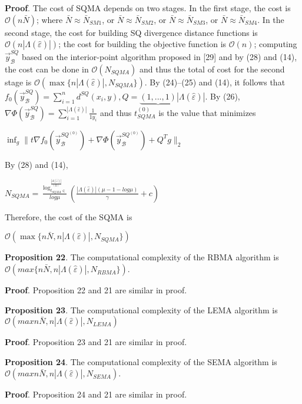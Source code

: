 \documentclass[]{iosart2c}
\begin{document}
\textbf{Proof}. The cost of SQMA depends on two stages. In
the first stage, the cost is $\mathcal{O}(n\bar N)$; where $\bar N \approx \bar N_{SM1}$, or $\bar N \approx \bar N_{SM2}$, or $\bar N \approx \bar N_{SM3}$, or $\bar N \approx \bar N_{SM4}$. In the
second stage, the cost for building SQ divergence distance
functions is $\mathcal{O}(n |\Lambda(\hat{\varepsilon})|)$; the cost for building
the objective function is $\mathcal{O}(n)$; computing $\vec{y}^{SQ}_\mathcal{B}$ based
on the interior-point algorithm proposed in [29] and
by (28) and (14), the cost can be done in $\mathcal{O}(N_{SQMA})$
and thus the total of cost for the second stage is
$\mathcal{O}(\max\{n |\Lambda(\hat{\varepsilon})|,N_{SQMA}\})$. By (24)–(25) and (14),
it follows that $f_0 \left( \vec{y}^{SQ}_\mathcal{B} \right) = \sum^n_{i=1} d^{SQ}(x_i, y), Q = \underbrace{(1, ... , 1)}{|\Lambda(\hat{\varepsilon})|}$. By (26), $\nabla \Phi \left( \vec{y}^{SQ}_\mathcal{B} \right) = \sum^{|\Lambda(\hat{\varepsilon})|}_{i=1} \frac{1}{1
y_i}$
and
thus $t^{(0)}_{SQMA}$ is the value that minimizes

$\inf_g\parallel t\nabla f_0 \left( \vec{y}^{SQ^{(0)}}_\mathcal{B} \right) +\nabla \Phi \left( \vec{y}^{SQ^{(0)}}_\mathcal{B} \right) + Q^T g \parallel_2$

By (28) and (14),

$N_{SQMA} =  \frac{ \log^{\frac{|\Lambda(\hat{\varepsilon})|}{(0)}}_{t_{SQMA} \in}}{log\mu}  \left( \frac{|\Lambda(\hat{\varepsilon})| (\mu - 1 - log\mu)}{\gamma} + c \right)$

Therefore, the cost of the SQMA is

$\mathcal{O}(\max\{n \bar N, n |\Lambda(\hat{\varepsilon})|,N_{SQMA}\})$

\textbf{Proposition 22}. The computational complexity of the RBMA algorithm is $\mathcal{O}(max\{n \bar N, n |\Lambda(\hat{\varepsilon})|,N_{RBMA}\})$.

\textbf{Proof}. Proposition 22 and 21 are similar in proof. 

\textbf{Proposition 23}. The computational complexity of the LEMA algorithm is $\mathcal{O}(max{n \bar N, n |\Lambda(\hat{\varepsilon})|,N_{LEMA}})$

\textbf{Proof}. Proposition 23 and 21 are similar in proof.

\textbf{Proposition 24}. The computational complexity of the
SEMA algorithm is $\mathcal{O}(max{n \bar N, n |\Lambda(\hat{\varepsilon})|,N_{SEMA}})$.

\textbf{Proof}. Proposition 24 and 21 are similar in proof.
\end{document}
